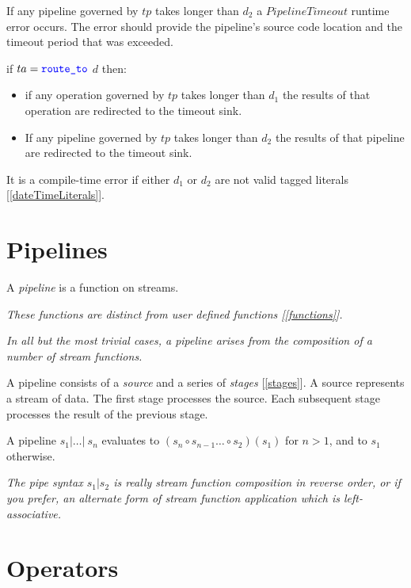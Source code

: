 \documentclass{article}
\begin{document}
If any pipeline governed by $tp$ takes longer than $d_2$ a $PipelineTimeout$ runtime error occurs. The error should provide the pipeline's  source code location and the timeout period that was exceeded.

if $ta = \texttt{\color{blue} route\_to}$ $d$ then:
  \begin{itemize}
  \item  if any operation governed by $tp$ takes longer than $d_1$ the results of that operation are redirected to the timeout sink.
  \item If any pipeline governed by $tp$ takes longer than $d_2$ the results of that pipeline are redirected to the timeout sink.
\end{itemize} 

It is a compile-time error if either $d_1$ or $d_2$ are not valid \DURATION{} tagged literals [\ref{dateTimeLiterals}].


\section{Pipelines}
\label{pipelines}

A {\em pipeline} is a function on streams.

{\em These functions are distinct from user defined functions [\ref{functions}]. }

{\em In all but the most trivial cases, a pipeline arises from the composition of a number of stream functions.
}

\Pipeline{}
\Source{}
\Stage{}

A pipeline consists of a {\em source} and a series of {\em stages} [\ref{stages}]. A source represents a stream of data. The first stage processes the  source. Each subsequent  stage processes the result of the previous stage.

A pipeline $s_1 | \ldots |  \ s_n$ evaluates to  $(s_n \circ s_{n-1}  \ldots \circ s_2)(s_1)$ for $n > 1$, and to $s_1$ otherwise.

{\em The pipe syntax $s_1 | s_2$  is really stream function composition in reverse order, or if you prefer, an alternate form of stream function application which is left-associative.}


\section{Operators}
\label{operators}
\end{document}
